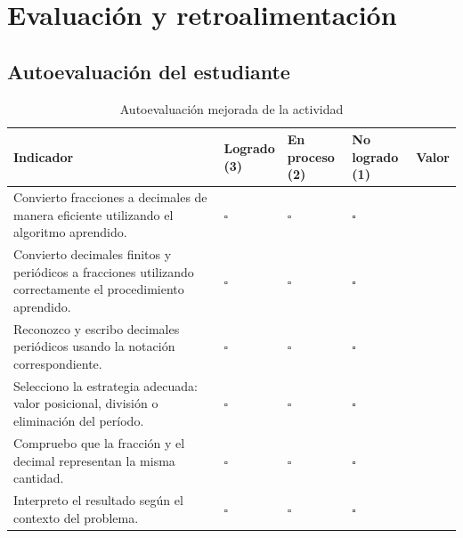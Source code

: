 \documentclass[
	spanish,
	letterpaper, oneside
]{article}
\begin{document}
\section{Evaluación y retroalimentación}

\subsection{Autoevaluación del estudiante}

\begin{table}[H]
\centering
\caption{Autoevaluación mejorada de la actividad}
\label{tab:autoevaluacion}

\small
\renewcommand{\arraystretch}{1.45}
\setlength{\tabcolsep}{5pt}

\begin{tabularx}{\textwidth}{@{}
>{\raggedright\arraybackslash}X
>{\centering\arraybackslash}p{}
>{\centering\arraybackslash}p{}
>{\centering\arraybackslash}p{}
>{\centering\arraybackslash}p{}
@{}}
\toprule
\textbf{Indicador} &
\makecell{\textbf{Logrado}\\\textbf{(3)}} &
\makecell{\textbf{En proceso}\\\textbf{(2)}} &
\makecell{\textbf{No logrado}\\\textbf{(1)}} &
\textbf{Valor} \\
\midrule

Convierto fracciones a decimales de manera eficiente utilizando el algoritmo aprendido.
& $\square$ & $\square$ & $\square$ & \\

Convierto decimales finitos y periódicos a fracciones utilizando correctamente el procedimiento aprendido.
& $\square$ & $\square$ & $\square$ & \\

Reconozco y escribo decimales periódicos usando la notación correspondiente.
& $\square$ & $\square$ & $\square$ & \\

Selecciono la estrategia adecuada: valor posicional, división o eliminación del período.
& $\square$ & $\square$ & $\square$ & \\

Compruebo que la fracción y el decimal representan la misma cantidad.
& $\square$ & $\square$ & $\square$ & \\

Interpreto el resultado según el contexto del problema.
& $\square$ & $\square$ & $\square$ & \\

\bottomrule
\end{tabularx}

\end{table}
\end{document}
